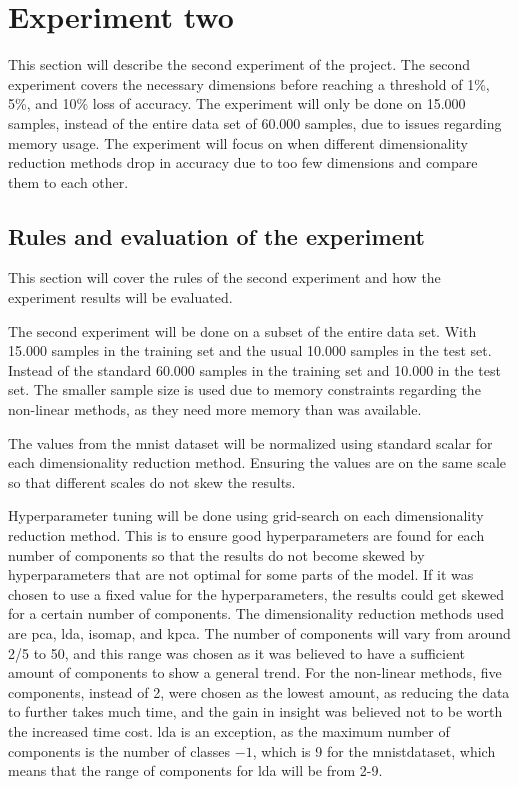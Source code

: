 \section{Experiment two}\label{sec:experiment_2}
This section will describe the second experiment of the project. The second experiment covers the necessary dimensions before reaching a threshold of 1\%, 5\%, and 10\% loss of accuracy. The experiment will only be done on 15.000 samples, instead of the entire data set of 60.000 samples, due to issues regarding memory usage. The experiment will focus on when different dimensionality reduction methods drop in accuracy due to too few dimensions and compare them to each other.


\subsection{Rules and evaluation of the experiment}\label{subsec:experiment_2_rules}
This section will cover the rules of the second experiment and how the experiment results will be evaluated.

The second experiment will be done on a subset of the entire data set. With 15.000 samples in the training set and the usual 10.000 samples in the test set. Instead of the standard 60.000 samples in the training set and 10.000 in the test set. The smaller sample size is used due to memory constraints regarding the non-linear methods, as they need more memory than was available.

The values from the mnist dataset will be normalized using standard scalar for each dimensionality reduction method. Ensuring the values are on the same scale so that different scales do not skew the results.

Hyperparameter tuning will be done using grid-search on each dimensionality reduction method. This is to ensure good hyperparameters are found for each number of components so that the results do not become skewed by hyperparameters that are not optimal for some parts of the model. If it was chosen to use a fixed value for the hyperparameters, the results could get skewed for a certain number of components.
The dimensionality reduction methods used are \gls{pca}, \gls{lda}, \gls{isomap}, and \gls{kpca}. The number of components will vary from around 2/5 to 50, and this range was chosen as it was believed to have a sufficient amount of components to show a general trend. For the non-linear methods, five components, instead of 2, were chosen as the lowest amount, as reducing the data to further takes much time, and the gain in insight was believed not to be worth the increased time cost. \gls{lda} is an exception, as the maximum number of components is the number of classes $-1$, which is 9 for the \gls{mnist}dataset, which means that the range of components for \gls{lda} will be from 2-9.

